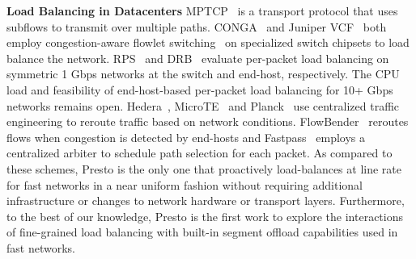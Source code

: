 
{\bf Load Balancing in Datacenters} 
MPTCP~\cite{mptcp,dc-mptcp} is a transport protocol that uses subflows to 
transmit over multiple paths.
CONGA~\cite{conga} and Juniper VCF~\cite{juniper-vcf} both employ congestion-aware flowlet switching~\cite{flowlet} on
specialized switch chipsets to load balance the network.
RPS~\cite{packetspray} and DRB~\cite{drb} evaluate per-packet load balancing on symmetric 1 Gbps networks
at the switch and end-host, respectively.
The CPU load and feasibility of end-host-based per-packet load balancing for 10+ Gbps networks remains open.
Hedera~\cite{hedera}, MicroTE~\cite{microte} and Planck~\cite{planck} use centralized traffic engineering to
reroute traffic based on network conditions.
FlowBender~\cite{flowbender} reroutes flows when congestion is detected by end-hosts and 
Fastpass~\cite{fastpass} employs a centralized arbiter to schedule path selection for each packet.
As compared to these schemes, Presto is the only one that proactively load-balances at line rate for fast networks
in a near uniform fashion without requiring additional infrastructure or changes
to network hardware or transport layers. Furthermore, to the best of our knowledge, Presto is
the first work to explore the interactions of fine-grained load balancing with built-in
segment offload capabilities used in fast networks.

